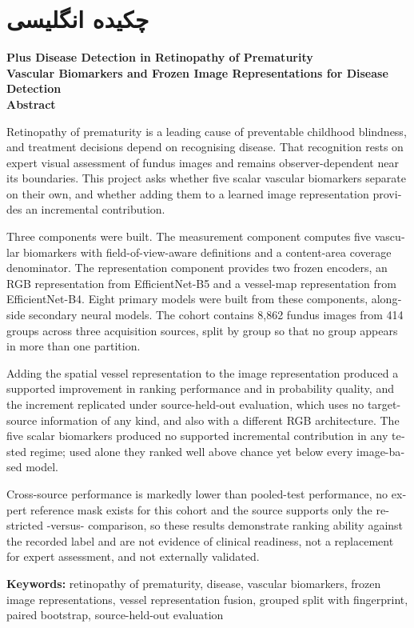 
\section*{چکیده انگلیسی}
\begin{latin}
\begin{center}
\Large\textbf{Plus Disease Detection in Retinopathy of Prematurity}\\[0.2cm]
\large\textbf{Vascular Biomarkers and Frozen Image Representations for  Disease Detection}\\[0.8cm]
\Large\textbf{Abstract}
\end{center}

\noindent
Retinopathy of prematurity is a leading cause of preventable childhood blindness, and treatment decisions depend on recognising  disease. That recognition rests on expert visual assessment of fundus images and remains observer-dependent near its boundaries. This project asks whether five scalar vascular biomarkers separate  on their own, and whether adding them to a learned image representation provides an incremental contribution.

Three components were built. The measurement component computes five vascular biomarkers with field-of-view-aware definitions and a content-area coverage denominator. The representation component provides two frozen encoders, an RGB representation from EfficientNet-B5 and a vessel-map representation from EfficientNet-B4. Eight primary models were built from these components, alongside secondary neural models. The cohort contains 8{,}862 fundus images from 414 groups across three acquisition sources, split by group so that no group appears in more than one partition.

Adding the spatial vessel representation to the image representation produced a supported improvement in ranking performance and in probability quality, and the increment replicated under source-held-out evaluation, which uses no target-source information of any kind, and also with a different RGB architecture. The five scalar biomarkers produced no supported incremental contribution in any tested regime; used alone they ranked well above chance yet below every image-based model.

Cross-source performance is markedly lower than pooled-test performance, no expert reference mask exists for this cohort and the  source supports only the restricted -versus- comparison, so these results demonstrate ranking ability against the recorded label and are not evidence of clinical readiness, not a replacement for expert assessment, and not externally validated.

\vspace{0.6cm}
\noindent\textbf{Keywords:}
retinopathy of prematurity,  disease, vascular biomarkers, frozen image representations,
vessel representation fusion, grouped split with fingerprint, paired bootstrap,
source-held-out evaluation
\end{latin}
\clearpage

